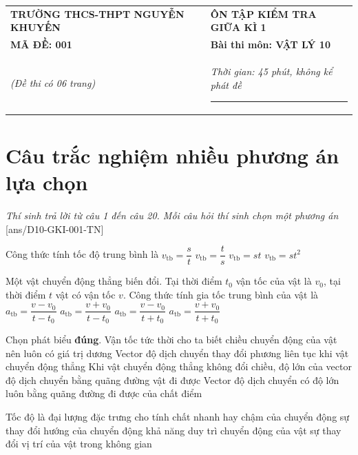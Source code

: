 \begin{center}
	\begin{tabular}{M{10cm}M{8cm}}
		\textbf{TRƯỜNG THCS-THPT NGUYỄN KHUYẾN}& \textbf{ÔN TẬP KIỂM TRA GIỮA KÌ 1}\\
		\textbf{MÃ ĐỀ: 001}& \textbf{Bài thi môn: VẬT LÝ 10}\\
		\textit{(Đề thi có 06 trang)}& \textit{Thời gian: 45 phút, không kể phát đề}
		
		\noindent\rule{4cm}{0.8pt} \\
	\end{tabular}
\end{center}
\setcounter{section}{0}
\section{Câu trắc nghiệm nhiều phương án lựa chọn}
\textit{Thí sinh trả lời từ câu 1 đến câu 20. Mỗi câu hỏi thí sinh chọn một phương án}
\setcounter{ex}{0}
[ans/D10-GKI-001-TN]
\begin{ex}
	Công thức tính tốc độ trung bình là	
	\choice
	{\True $v_{\text{tb}}=\dfrac{s}{t}$}
	{$v_{\text{tb}}=\dfrac{t}{s}$}
	{$v_{\text{tb}}=st$}
	{$v_{\text{tb}}=st^2$}
	\loigiai{}
\end{ex}
\begin{ex}
	Một vật chuyển động thẳng biến đổi. Tại thời điểm $t_0$ vận tốc của vật là $v_0$, tại thời điểm $t$ vật có vận tốc $v$. Công thức tính gia tốc trung bình của vật là	
	\choice
	{\True $a_{\text{tb}}=\dfrac{v-v_0}{t-t_0}$}
	{$a_{\text{tb}}=\dfrac{v+v_0}{t-t_0}$}
	{$a_{\text{tb}}=\dfrac{v-v_0}{t+t_0}$}
	{$a_{\text{tb}}=\dfrac{v+v_0}{t+t_0}$}
	\loigiai{}
\end{ex}
\begin{ex}
	Chọn phát biểu \textbf{đúng}.
	\choice
	{Vận tốc tức thời cho ta biết chiều chuyển động của vật nên luôn có giá trị dương}
	{Vector độ dịch chuyển thay đổi phương liên tục khi vật chuyển động thẳng}
	{\True Khi vật chuyển động thẳng không đổi chiều, độ lớn của vector độ dịch chuyển bằng quãng đường vật đi được}
	{Vector độ dịch chuyển có độ lớn luôn bằng quãng đường đi được của chất điểm}
	\loigiai{}
\end{ex}
\begin{ex}
	Tốc độ là đại lượng đặc trưng cho
	\choice
	{\True tính chất nhanh hay chậm của chuyển động}
	{sự thay đổi hướng của chuyển động}
	{khả năng duy trì chuyển động của vật}
	{sự thay đổi vị trí của vật trong không gian}
	\loigiai{}
\end{ex}
